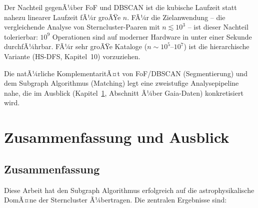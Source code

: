﻿\documentclass[a4paper,12pt]{report}
\theoremstyle{definition}
\begin{document}
Der Nachteil gegenÃ¼ber FoF und DBSCAN ist die kubische Laufzeit statt nahezu linearer Laufzeit fÃ¼r groÃŸe $n$. FÃ¼r die Zielanwendung -- die vergleichende Analyse von Sterncluster-Paaren mit $n \lesssim 10^3$ -- ist dieser Nachteil tolerierbar: $10^9$ Operationen sind auf moderner Hardware in unter einer Sekunde durchfÃ¼hrbar. FÃ¼r sehr groÃŸe Kataloge ($n \sim 10^5$--$10^7$) ist die hierarchische Variante (HS-DFS, Kapitel~10) vorzuziehen.

Die natÃ¼rliche KomplementaritÃ¤t von FoF/DBSCAN (Segmentierung) und dem Subgraph Algorithmus (Matching) legt eine zweistufige Analysepipeline nahe, die im Ausblick (Kapitel~\ref{chap:zusammenfassung}, Abschnitt Ã¼ber Gaia-Daten) konkretisiert wird.

\chapter{Zusammenfassung und Ausblick}
\label{chap:zusammenfassung}

\section{Zusammenfassung}

Diese Arbeit hat den Subgraph Algorithmus erfolgreich auf die astrophysikalische DomÃ¤ne der Sterncluster Ã¼bertragen. Die zentralen Ergebnisse sind:
\end{document}
